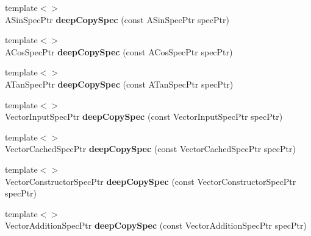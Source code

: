 \begin{DoxyCompactItemize}
\item 
\hypertarget{namespacegiskard__suturo_ac475415b481d74d2551e0a72a2074c55}{{\footnotesize template$<$$>$ }\\A\-Sin\-Spec\-Ptr {\bfseries deep\-Copy\-Spec} (const A\-Sin\-Spec\-Ptr spec\-Ptr)}\label{namespacegiskard__suturo_ac475415b481d74d2551e0a72a2074c55}

\item 
\hypertarget{namespacegiskard__suturo_a604510a9cac5bbfc9b609547074bd186}{{\footnotesize template$<$$>$ }\\A\-Cos\-Spec\-Ptr {\bfseries deep\-Copy\-Spec} (const A\-Cos\-Spec\-Ptr spec\-Ptr)}\label{namespacegiskard__suturo_a604510a9cac5bbfc9b609547074bd186}

\item 
\hypertarget{namespacegiskard__suturo_a643ccb0a112249821cb6291cc6307c6e}{{\footnotesize template$<$$>$ }\\A\-Tan\-Spec\-Ptr {\bfseries deep\-Copy\-Spec} (const A\-Tan\-Spec\-Ptr spec\-Ptr)}\label{namespacegiskard__suturo_a643ccb0a112249821cb6291cc6307c6e}

\item 
\hypertarget{namespacegiskard__suturo_a4b98779702d7936c749468c8d4a88192}{{\footnotesize template$<$$>$ }\\Vector\-Input\-Spec\-Ptr {\bfseries deep\-Copy\-Spec} (const Vector\-Input\-Spec\-Ptr spec\-Ptr)}\label{namespacegiskard__suturo_a4b98779702d7936c749468c8d4a88192}

\item 
\hypertarget{namespacegiskard__suturo_a7e2071c843fff088995c61ad9a715d36}{{\footnotesize template$<$$>$ }\\Vector\-Cached\-Spec\-Ptr {\bfseries deep\-Copy\-Spec} (const Vector\-Cached\-Spec\-Ptr spec\-Ptr)}\label{namespacegiskard__suturo_a7e2071c843fff088995c61ad9a715d36}

\item 
\hypertarget{namespacegiskard__suturo_ac971ac6213c25e37815a2151818a00cd}{{\footnotesize template$<$$>$ }\\Vector\-Constructor\-Spec\-Ptr {\bfseries deep\-Copy\-Spec} (const Vector\-Constructor\-Spec\-Ptr spec\-Ptr)}\label{namespacegiskard__suturo_ac971ac6213c25e37815a2151818a00cd}

\item 
\hypertarget{namespacegiskard__suturo_a0b7870ce7ae336158c6e8c2524753682}{{\footnotesize template$<$$>$ }\\Vector\-Addition\-Spec\-Ptr {\bfseries deep\-Copy\-Spec} (const Vector\-Addition\-Spec\-Ptr spec\-Ptr)}\label{namespacegiskard__suturo_a0b7870ce7ae336158c6e8c2524753682}


\end{DoxyCompactItemize}
